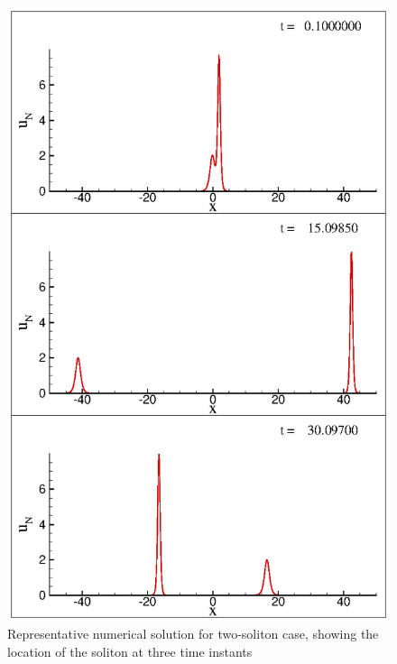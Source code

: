 \begin{figure}
\centerline{
\includegraphics[width=0.5\linewidth]{Fig_15}
}
\caption{Representative numerical solution for two-soliton case, showing the location of the soliton at three time instants}
\label{fig:two1}
\end{figure}

